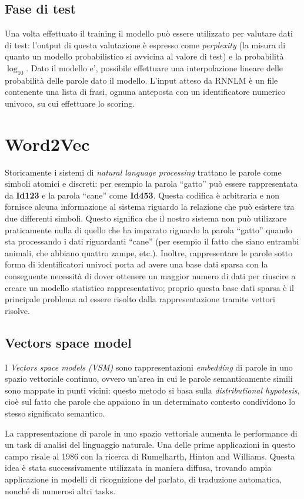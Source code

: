 \documentclass[a4paper,12pt,openright,twoside]{report}
\theoremstyle{definition}
\begin{document}
\subsection{Fase di test}
Una volta effettuato il training il modello può essere utilizzato per valutare dati di test:
l'output di questa valutazione è espresso come \emph{perplexity} (la misura di quanto un modello probabilistico
si avvicina al valore di test) e la 
probabilità $\log_{10}$.
Dato il modello e', possibile effettuare una interpolazione lineare delle probabilità delle parole dato il modello. L'input atteso
da RNNLM è un file contenente una lista di frasi, ognuna anteposta con un identificatore
numerico univoco, su cui effettuare lo scoring.

\section{Word2Vec}
Storicamente i sistemi di \emph{natural language processing} trattano le parole come simboli atomici e discreti:
per esempio la parola ``gatto'' può essere rappresentata da \textbf{Id123} e la parola ``cane'' come \textbf{Id453}.
Questa codifica è arbitraria e non fornisce alcuna informazione al sistema riguardo la relazione
che può esistere tra due differenti simboli.
Questo significa che il nostro sistema non può utilizzare praticamente nulla di quello che ha imparato
riguardo la parola ``gatto'' quando sta processando i dati riguardanti ``cane'' (per esempio il fatto che siano
entrambi animali, che abbiano quattro zampe, etc.).
Inoltre, rappresentare le parole sotto forma di identificatori univoci porta ad avere una base dati sparsa
con la conseguente necessità di dover ottenere un maggior numero di dati per riuscire a creare un modello
statistico rappresentativo; proprio questa base dati sparsa è il principale problema 
ad essere risolto dalla rappresentazione tramite vettori risolve.

\subsection{Vectors space model}
I \emph{Vectors space models (VSM)} sono rappresentazioni \emph{embedding} di parole in uno spazio vettoriale 
continuo, ovvero un'area in cui le parole
semanticamente simili sono mappate in punti vicini: questo metodo si basa sulla \emph{distributional hypotesis}, 
cioè sul fatto che parole che appaiono in 
un determinato contesto condividono lo stesso significato semantico.

La rappresentazione di parole in uno spazio vettoriale aumenta le performance
di un task di analisi del linguaggio naturale. Una delle prime
applicazioni in questo campo risale al 1986 con la ricerca di Rumelharth, Hinton and Williams.
Questa idea è stata successivamente utilizzata in maniera diffusa, trovando ampia 
applicazione in modelli di ricognizione del parlato,
di traduzione automatica, nonché di numerosi altri tasks.
\end{document}
